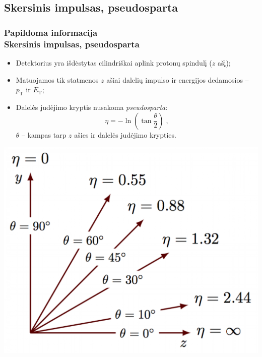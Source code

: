 \documentclass[xcolor=dvipsnames]{beamer}
\newcommand{\pT}{\mathit{p}_{\mathrm{T}}}
\newcommand{\ET}{\mathit{E}_{\mathrm{T}}}
\begin{document}
\begin{frame}
	\subsection{Skersinis impulsas, pseudosparta}
	\frametitle{Papildoma informacija\\ \small Skersinis impulsas, pseudosparta}
	\begin{minipage}{0.49\textwidth}
		\begin{itemize}
			\item Detektorius yra išdėstytas cilindriškai aplink protonų spindulį ($\mathit{z}$ ašį);
			\item Matuojamos tik statmenos $\mathit{z}$ ašiai dalelių impulso ir energijos dedamosios --
			$\pT$ ir $\ET$;
			\item Dalelės judėjimo kryptis nusakoma \textit{pseudosparta}:
			\begin{equation*}
				\eta = - \ln \left( \tan \frac{\theta}{2} \right) \; ,
			\end{equation*}
			$\theta$ -- kampas tarp $\mathit{z}$ ašies ir dalelės judėjimo krypties.
		\end{itemize}
	\end{minipage}
	\hfill
	\begin{minipage}{0.48\textwidth}
		\centering
		\includegraphics[width=\textwidth]{theta-eta.png}
	\end{minipage}	
\end{frame}
\end{document}
